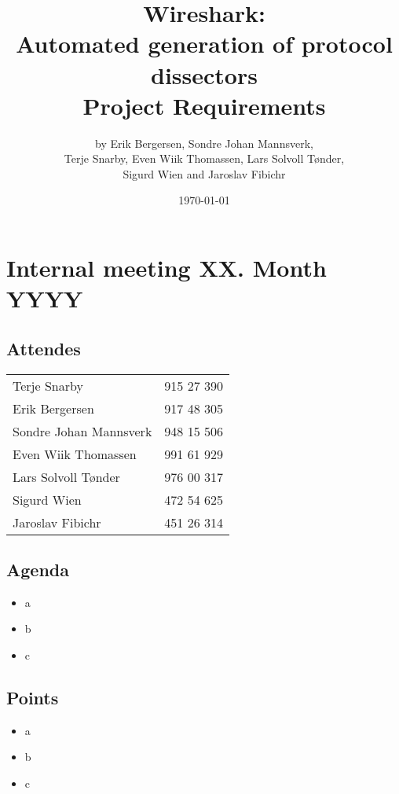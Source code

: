 \documentclass[a4paper, 11pt]{report}
\title{Wireshark:\\ Automated generation of protocol dissectors\\
		Project Requirements}
\author{by Erik Bergersen, Sondre Johan Mannsverk,\\ Terje Snarby,
		Even Wiik Thomassen, Lars Solvoll Tønder,\\ Sigurd Wien
		and Jaroslav Fibichr}
\date{\today}
\begin{document}
\section*{Internal meeting XX. Month YYYY}

\subsection*{Attendes}

\begin{tabular}{ l  l}
Terje Snarby & 915 27 390 \\
Erik Bergersen & 917 48 305 \\
Sondre Johan Mannsverk & 948 15 506 \\
Even Wiik Thomassen & 991 61 929 \\
Lars Solvoll Tønder & 976 00 317 \\
Sigurd Wien & 472 54 625 \\
Jaroslav Fibichr & 451 26 314 \\

\end{tabular}



\subsection*{Agenda}

\begin{itemize}
\item a
\item b
\item c
\end{itemize}

\subsection*{Points}

\begin{itemize}
\item a
\item b
\item c
\end{itemize}
\end{document}
